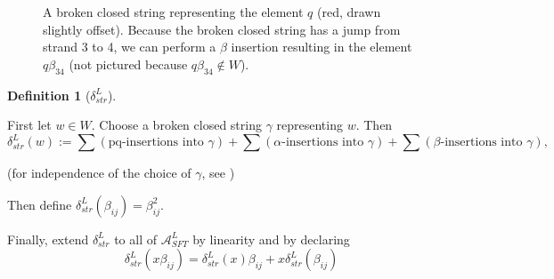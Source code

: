\documentclass[a4paper,final, reqno]{amsart}
\theoremstyle{plain}
\theoremstyle{definition}
\newtheorem{Def}[Th]{Definition}
\newcommand{\A}{\mathcal{A}}
\begin{document}
\begin{figure}
		\caption[A $\beta$-insertion into a broken closed string]{A broken closed string representing the element $q$ (red, drawn slightly offset). Because the broken closed string has a jump from strand 3 to 4, we can perform a $\beta$ insertion resulting in the element $q\beta_{34}$ (not pictured because $q\beta_{34} \not\in W$).}\label{fig:betainsertion}
	\end{figure}
	
	
	\begin{Def}[$\delta_{str}^L$]\label{def:alstrdiff}\-\
		
		First let $w \in W$. Choose a broken closed string $\gamma$ representing $w$. Then 
		\[ \delta_{str}^L(w):= \sum (\text{pq-insertions into } \gamma) + \sum (\alpha \text{-insertions into } \gamma) + \sum (\beta \text{-insertions into } \gamma), \]
		
		(for independence of the choice of $\gamma$, see )
		
		Then define $\delta_{str}^L(\beta_{ij}) = \beta_{ij}^2$. 
		
		Finally, extend $\delta_{str}^L$ to all of $\A^L_{SFT}$ by linearity and by declaring 
		\[ \delta_{str}^L(x\beta_{ij}) = \delta_{str}^L(x)\beta_{ij} + x\delta_{str}^L(\beta_{ij})\]
	\end{Def}
	
\end{document}
